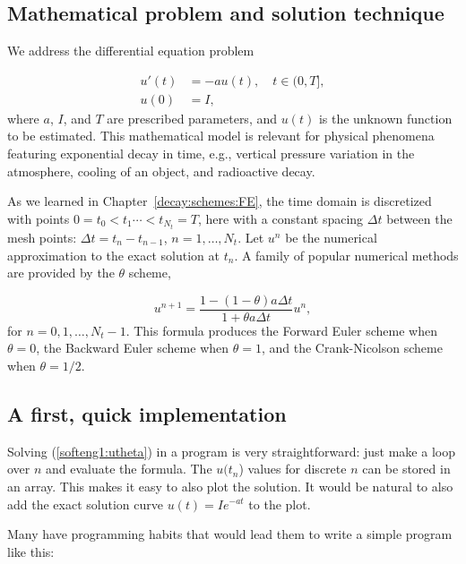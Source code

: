 \documentclass[graybox,sectrefs,envcountresetchap,open=right,final]{svmonodo}
\begin{document}
\subsection{Mathematical problem and solution technique}
\label{softeng1:basic:math}

We address the differential equation problem

\begin{align}
u'(t) &= -au(t), \quad t \in (0,T], \label{softeng1:ode}\\ 
u(0)  &= I,                         \label{softeng1:u0}
\end{align}
where $a$, $I$, and $T$ are prescribed parameters, and $u(t)$ is
the unknown function to be estimated. This mathematical model
is relevant for physical phenomena featuring exponential decay
in time, e.g., vertical pressure variation in the atmosphere,
cooling of an object, and radioactive decay.

As we learned in Chapter~\ref{decay:schemes:FE}, the
time domain is discretized with points $0 = t_0 < t_1 \cdots < t_{N_t}=T$,
here with a constant spacing $\Delta t$ between the
mesh points: $\Delta t = t_{n}-t_{n-1}$, $n=1,\ldots,N_t$. Let
$u^n$ be the numerical approximation to the exact solution at $t_n$.
A family of popular numerical methods are provided by the $\theta$ scheme,

\begin{equation}
u^{n+1} = \frac{1 - (1-\theta) a\Delta t}{1 + \theta a\Delta t}u^n,
\label{softeng1:utheta}
\end{equation}
for $n=0,1,\ldots,N_t-1$. This formula produces
the Forward Euler
scheme when $\theta=0$,
the Backward Euler
scheme when $\theta=1$,
and the Crank-Nicolson
scheme when $\theta=1/2$.

\subsection{A first, quick implementation}
\label{softeng1:basic:impl1}

Solving (\ref{softeng1:utheta}) in a program is very straightforward:
just make a loop over $n$ and evaluate the formula. The $u(t_n$)
values for discrete $n$ can be stored in an array. This makes it easy
to also plot the solution. It would be natural to also add
the exact
solution curve $u(t)=Ie^{-at}$ to the plot.

Many have programming habits that would lead them
to write a simple program like this:
\end{document}
